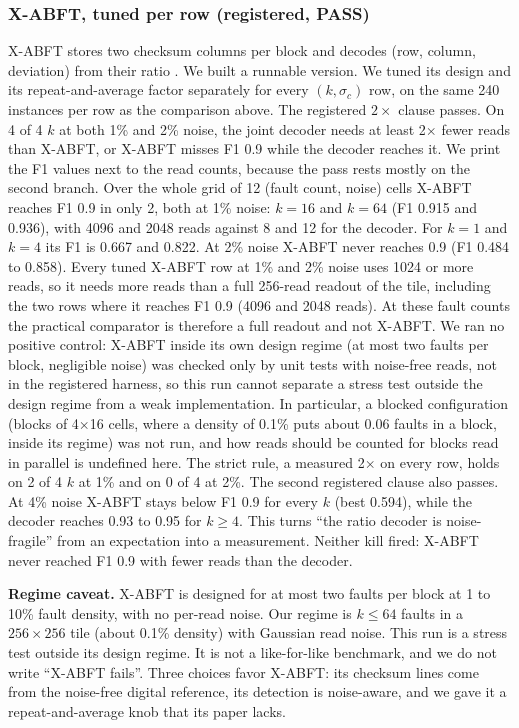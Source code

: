 \documentclass[journal]{IEEEtran}
\begin{document}
\subsubsection{X-ABFT, tuned per row (registered, PASS)}
X-ABFT stores two checksum columns per block and decodes (row, column, deviation) from their ratio \cite{liu2020xabft}. We built a runnable version. We tuned its design and its repeat-and-average factor separately for every $(k,\sigma_c)$ row, on the same 240 instances per row as the comparison above. The registered $2\times$ clause passes. On 4 of 4 $k$ at both 1\% and 2\% noise, the joint decoder needs at least 2$\times$ fewer reads than X-ABFT, or X-ABFT misses F1 0.9 while the decoder reaches it.
We print the F1 values next to the read counts, because the pass rests mostly on the second branch. Over the whole grid of 12 (fault count, noise) cells X-ABFT reaches F1 0.9 in only 2, both at 1\% noise: $k=16$ and $k=64$ (F1 0.915 and 0.936), with 4096 and 2048 reads against 8 and 12 for the decoder. For $k=1$ and $k=4$ its F1 is 0.667 and 0.822.
At 2\% noise X-ABFT never reaches 0.9 (F1 0.484 to 0.858).
Every tuned X-ABFT row at 1\% and 2\% noise uses 1024 or more reads, so it needs more reads than a full 256-read readout of the tile, including the two rows where it reaches F1 0.9 (4096 and 2048 reads).
At these fault counts the practical comparator is therefore a full readout and not X-ABFT. We ran no positive control: X-ABFT inside its own design regime (at most two faults per block, negligible noise) was checked only by unit tests with noise-free reads, not in the registered harness, so this run cannot separate a stress test outside the design regime from a weak implementation. In particular, a blocked configuration (blocks of 4$\times$16 cells, where a density of 0.1\% puts about 0.06 faults in a block, inside its regime) was not run, and how reads should be counted for blocks read in parallel is undefined here.
The strict rule, a measured 2$\times$ on every row, holds on 2 of 4 $k$ at 1\% and on 0 of 4 at 2\%.
The second registered clause also passes. At 4\% noise X-ABFT stays below F1 0.9 for every $k$ (best 0.594), while the decoder reaches 0.93 to 0.95 for $k\ge4$. This turns ``the ratio decoder is noise-fragile'' from an expectation into a measurement.
Neither kill fired: X-ABFT never reached F1 0.9 with fewer reads than the decoder.

\textbf{Regime caveat.} X-ABFT is designed for at most two faults per block at 1 to 10\% fault density, with no per-read noise. Our regime is $k\le64$ faults in a $256\times256$ tile (about 0.1\% density) with Gaussian read noise. This run is a stress test outside its design regime. It is not a like-for-like benchmark, and we do not write ``X-ABFT fails''.
Three choices favor X-ABFT: its checksum lines come from the noise-free digital reference, its detection is noise-aware, and we gave it a repeat-and-average knob that its paper lacks.
\end{document}
